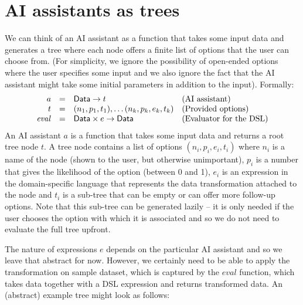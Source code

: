 \documentclass{article}
\begin{document}
\section{AI assistants as trees}
We can think of an AI assistant as a function that takes some input data and generates
a tree where each node offers a finite list of options that the user can choose from. (For
simplicity, we ignore the possibility of open-ended options where the user specifies some input 
and we also ignore the fact that the AI assistant might take some initial parameters in addition
to the input). Formally:
%
\begin{equation*}
\begin{array}{rcll}
a &=& \textnormal{\sffamily Data} \rightarrow t &\textnormal{(AI assistant)}\\
t &=& (n_1, p_1, t_1), \ldots (n_k, p_k, e_k, t_k) &\textnormal{(Provided options)}\\
\mathit{eval} &=& \textnormal{\sffamily Data}\times e \rightarrow \textnormal{\sffamily Data}&\textnormal{(Evaluator for the DSL)}
\end{array}
\end{equation*}
%
An AI assistant $a$ is a function that takes some input data and returns a root tree node $t$. 
A tree node contains a list of options $(n_i, p_i, e_i, t_i)$ where $n_i$ is a name of the node (shown
to the user, but otherwise unimportant), $p_i$ is a number that gives the likelihood of the 
option (between 0 and 1), $e_i$ is an expression in the domain-specific language that represents
the data transformation attached to the node and $t_i$ is a sub-tree that can be empty or can offer 
more follow-up options. Note that this sub-tree can be generated lazily -- it is only needed if the 
user chooses the option with which it is associated and so we do not need to evaluate the full tree 
upfront.

The nature of expressions $e$ depends on the particular AI assistant and so we leave that abstract
for now. However, we certainly need to be able to apply the transformation on sample dataset, 
which is captured by the $\mathit{eval}$ function, which takes data together with a DSL expression
and returns transformed data. An (abstract) example tree might look as follows:
\end{document}
